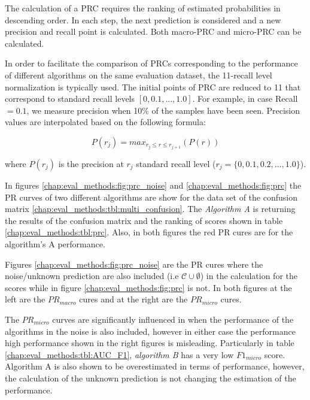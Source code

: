 The calculation of a PRC requires the ranking of estimated probabilities in descending order. In each step, the next prediction is considered and a new precision and recall point is calculated. Both macro-PRC and micro-PRC can be calculated.

In order to facilitate the comparison of PRCs corresponding to the performance of different algorithms on the same evaluation dataset, the 11-recall level normalization is typically used. The initial points of PRC are reduced to 11 that correspond to standard recall levels $[0,0.1,...,1.0]$. For example, in case Recall$=0.1$, we measure precision when 10\% of the samples have been seen. Precision values are interpolated based on the following formula:

\begin{equation}\label{chap:eval_methods:eq:11recall_level}
	P(r_j)=max_{r_j \leqslant r \leqslant r_{j+1}}(P(r))
\end{equation}

\noindent
where $P(r_j)$ is the precision at $r_j$ standard recall level ($r_j=\{0,0.1,0.2,...,1.0\}$).

In figures \ref{chap:eval_methods:fig:prc_noise} and \ref{chap:eval_methods:fig:prc} the PR curves of two different algorithms are show for the data set of the confusion matrix \ref{chap:eval_methods:tbl:multi_confusion}. The \textit{Algorithm A} is returning the results of the confusion matrix and the ranking of scores shown in table \ref{chap:eval_methods:tbl:prc}. Also, in both figures the red PR cures are for the algorithm's A performance.

Figures \ref{chap:eval_methods:fig:prc_noise} are the PR cures where the noise/unknown prediction are also included (i.e $\mathcal{C} \cup \emptyset$) in the calculation for the scores while in figure \ref{chap:eval_methods:fig:prc} is not. In both figures at the left are the $PR_{macro}$ cures and at the right are the $PR_{micro}$ cures. 

The $PR_{micro}$ curves are significantly influenced in when the performance of the algorithms in the noise is also included, however in either case the performance high performance shown in the right figures is misleading. Particularly in table \ref{chap:eval_methods:tbl:AUC_F1}, \textit{algorithm B} has a very low $F1_{micro}$ score. Algorithm A is also shown to be overestimated in terms of performance, however, the calculation of the unknown prediction is not changing the estimation of the performance. 

